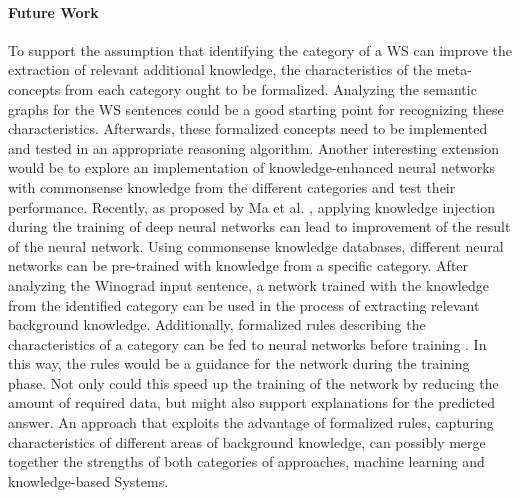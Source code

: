 \paragraph{Future Work}
To support the assumption that identifying the category of a WS can improve the extraction of relevant additional knowledge, the characteristics of the meta-concepts from each category ought to be formalized. Analyzing the semantic graphs for the WS sentences could be a good starting point for recognizing these characteristics. Afterwards, these formalized concepts need to be implemented and tested in an appropriate reasoning algorithm. 
Another interesting extension would be to explore an implementation of knowledge-enhanced neural networks with commonsense knowledge from the different categories and test their performance. Recently, as proposed by Ma et al. \cite{DBLP:conf/aaai/MaPC18}, applying knowledge injection during the training of deep neural networks can lead to improvement of the result of the neural network. Using commonsense knowledge databases, different neural networks can be pre-trained with knowledge from a specific category. After analyzing the Winograd input sentence, a network trained with the knowledge from the identified category can be used in the process of extracting relevant background knowledge. 
Additionally, formalized rules describing the characteristics of a category can be fed to neural networks before training \cite{DBLP:conf/aaai/RoychowdhuryDG18}. In this way, the rules would be a guidance for the network during the training phase. Not only could this speed up the training of the network by reducing the amount of required data, but might also support explanations for the predicted answer. An approach that exploits the advantage of formalized rules, capturing characteristics of different areas of background knowledge, can possibly merge together the strengths of both categories of approaches, machine learning and knowledge-based Systems. 
 
